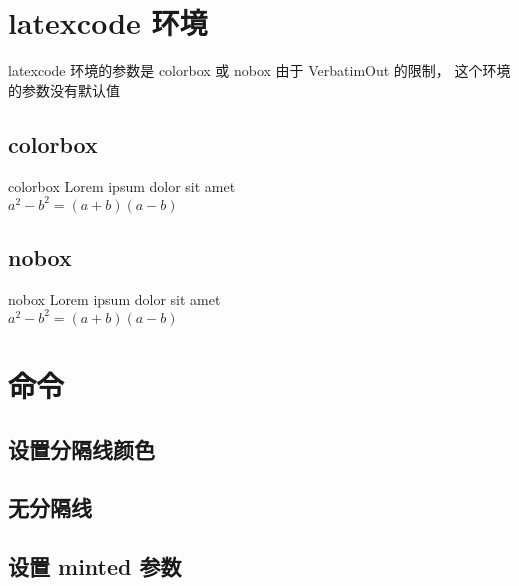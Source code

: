 \documentclass{ctexart}
\begin{document}
\section{ latexcode 环境 }

latexcode 环境的参数是 colorbox 或 nobox 
由于 VerbatimOut 的限制， 这个环境的参数没有默认值

\subsection{colorbox}

\begin{latexcode}{colorbox}
Lorem ipsum dolor sit amet\\
$a^2 - b^2 = (a+b)(a-b)$ 
\end{latexcode}

\subsection{nobox}

\begin{latexcode}{nobox}
Lorem ipsum dolor sit amet\\
$a^2 - b^2 = (a+b)(a-b)$ 
\end{latexcode}

\section{\protect{}命令}

\subsection{设置分隔线颜色 \protect\verbum{[color=cyan]}}


\subsection{无分隔线 \protect\verbum{[color=\{\}]}}


\subsection{设置 minted 参数 \protect\verbum{[mint=\{linenos\}]}}

%\inputlatexcode[mint={linenos,bgcolor=cyan}]{lorem-ipsum.tex}
\end{document}
